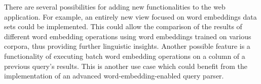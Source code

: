 There are several possibilities for adding new functionalities to the web application. For example, an entirely new view focused on word embeddings data sets could be implemented. This could allow the comparison of the results of different word embedding operations using word embeddings trained on various corpora, thus providing further linguistic insights. Another possible feature is a functionality of executing batch word embedding operations on a column of a previous query's results. This is another use case which could benefit from the implementation of an advanced word-embedding-enabled query parser.